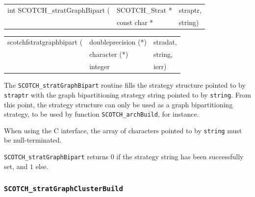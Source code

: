 \begin{itemize}
\progsyn

{\tt\begin{tabular}{l@{}ll}
int SCOTCH\_stratGraphBipart ( & SCOTCH\_Strat * & straptr, \\
                               & const char *    & string)
\end{tabular}}

{\tt\begin{tabular}{l@{}ll}
scotchfstratgraphbipart ( & doubleprecision (*) & stradat, \\
                          & character (*)       & string,  \\
                          & integer             & ierr)
\end{tabular}}

\progdes

The {\tt SCOTCH\_stratGraphBipart} routine fills the strategy structure
pointed to by {\tt straptr} with the graph bipartitioning strategy
string pointed to by {\tt string}. From this point, the strategy
structure can only be used as a graph bipartitioning strategy, to be
used by function {\tt SCOTCH\_\lbt arch\lbt Build}, for instance.

When using the C interface, the array of characters pointed to by
{\tt string} must be null-terminated.

\progret

{\tt SCOTCH\_stratGraphBipart} returns $0$ if the strategy string has
been successfully set, and $1$ else.
\end{itemize}

\subsubsection{{\tt SCOTCH\_stratGraphClusterBuild}}
\label{sec-lib-func-stratgraphclusterbuild}

